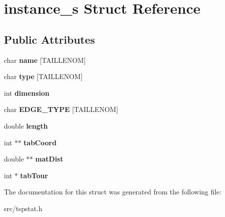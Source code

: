 \hypertarget{structinstance__s}{}\section{instance\+\_\+s Struct Reference}
\label{structinstance__s}
\subsection*{Public Attributes}
\begin{DoxyCompactItemize}
\item 
\mbox{\label{structinstance__s_a565608b0bf4d8a4efe7dd6ba865a2844}} 
char {\bfseries name} \mbox{[}T\+A\+I\+L\+L\+E\+N\+OM\mbox{]}
\item 
\mbox{\label{structinstance__s_a4a6dadd1e948103a3c5186a584d16331}} 
char {\bfseries type} \mbox{[}T\+A\+I\+L\+L\+E\+N\+OM\mbox{]}
\item 
\mbox{\label{structinstance__s_a28711b0862ace836adb63c8a1830e1f8}} 
int {\bfseries dimension}
\item 
\mbox{\label{structinstance__s_a517ec13ff6b5c9bfba128dbe94787d8f}} 
char {\bfseries E\+D\+G\+E\+\_\+\+T\+Y\+PE} \mbox{[}T\+A\+I\+L\+L\+E\+N\+OM\mbox{]}
\item 
\mbox{\label{structinstance__s_a45dbdbfcdcbf773d2cb14f5d880623ff}} 
double {\bfseries length}
\item 
\mbox{\label{structinstance__s_a459b9878fd7b9b224362f973099fff58}} 
int $\ast$$\ast$ {\bfseries tab\+Coord}
\item 
\mbox{\label{structinstance__s_a38f0946439fb1f1149ececdca0055e0d}} 
double $\ast$$\ast$ {\bfseries mat\+Dist}
\item 
\mbox{\label{structinstance__s_a4c6450701def0f8ddd62426d523a2731}} 
int $\ast$ {\bfseries tab\+Tour}
\end{DoxyCompactItemize}


The documentation for this struct was generated from the following file\+:\begin{DoxyCompactItemize}
\item 
src/tspstat.\+h\end{DoxyCompactItemize}
